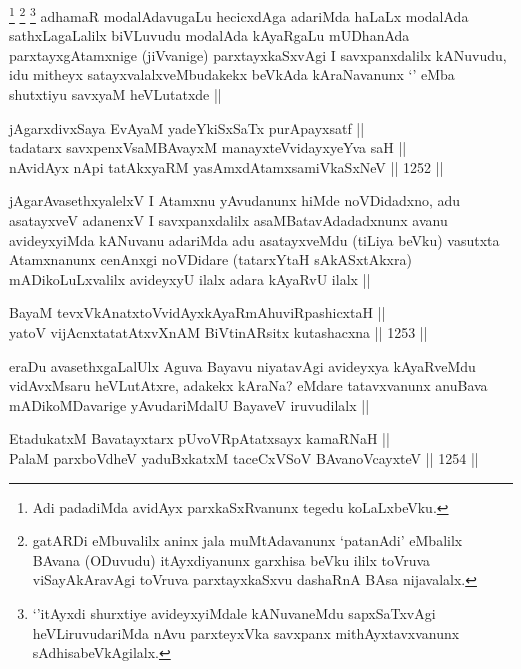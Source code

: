 \begin{artha}
\footnote{Adi padadiMda avidAyx parxkaSxRvanunx tegedu koLaLxbeVku.}
\footnote{gatARDi eMbuvalilx aninx jala muMtAdavanunx `patanAdi' eMbalilx BAvana (ODuvudu) itAyxdiyanunx garxhisa beVku ililx toVruva viSayAkAravAgi toVruva parxtayxkaSxvu dashaRnA BAsa nijavalalx.}
\footnote{`\stext'itAyxdi shurxtiye avideyxyiMdale kANuvaneMdu sapxSaTxvAgi heVLiruvudariMda nAvu parxteyxVka savxpanx mithAyxtavxvanunx sAdhisabeVkAgilalx.}
adhamaR modalAdavugaLu hecicxdAga adariMda haLaLx modalAda sathxLagaLalilx biVLuvudu modalAda kAyaRgaLu mUDhanAda parxtayxgAtamxnige (jiVvanige) parxtayxkaSxvAgi I savxpanxdalilx kANuvudu, idu mitheyx satayxvalalxveMbudakekx beVkAda kAraNavanunx `\stext' eMba shutxtiyu savxyaM heVLutatxde ||
\end{artha}


\begin{shl}
jAgarxdivxSaya EvAyaM yadeYkiSxSaTx purA\s payxsatf || \\
tadatarx savxpenxV\s saMBAvayxM manayxteV\s vidayxyeYva saH || \\
nAvidAyx nApi tatAkxyaRM yasAmxdAtamxsamiVkaSxNeV ||  1252 ||  
\end{shl}

\begin{artha}
jAgarAvasethxyalelxV I Atamxnu yAvudanunx hiMde noVDidadxno, adu asatayxveV adanenxV I savxpanxdalilx asaMBatavAdadadxnunx avanu avideyxyiMda kANuvanu adariMda adu asatayxveMdu (tiLiya beVku) vasutxta Atamxnanunx cenAnxgi noVDidare (tatarxYtaH sAkASxtAkxra) mADikoLuLxvalilx avideyxyU ilalx adara kAyaRvU ilalx ||
\end{artha}

\begin{shl}
BayaM tevxVkAnatxtoV\s vidAyxkAyaRmAhuviRpashicxtaH ||  \\
yatoV vijAcnxtatatAtxvXnAM BiVtinARsitx kutashacxna ||  1253 ||  
\end{shl}

\begin{artha}
eraDu avasethxgaLalUlx Aguva Bayavu niyatavAgi avideyxya kAyaRveMdu vidAvxMsaru heVLutAtxre, adakekx kAraNa? eMdare tatavxvanunx anuBava mADikoMDavarige yAvudariMdalU BayaveV iruvudilalx ||
\end{artha}

\begin{shl}
EtadukatxM Bavatayxtarx pUvoVRpAtatxsayx kamaRNaH || \\
PalaM parxboVdheV yaduBxkatxM taceCxVSoV BAvanoVcayxteV ||  1254 ||  
\end{shl}

